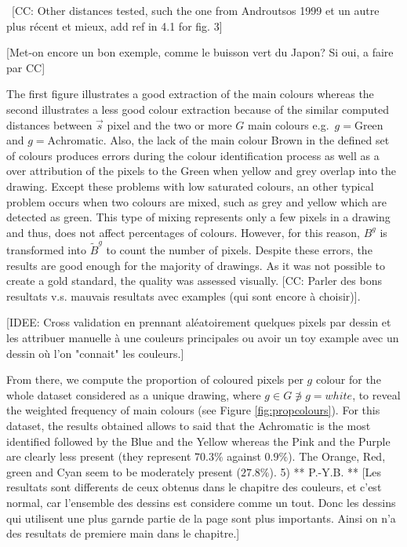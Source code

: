 \documentclass[11pt,a4paper]{article}
\begin{document}
\
{\color{red}[CC: Other distances tested, such the one from Androutsos 1999 et un autre plus récent et mieux, add ref in 4.1 for fig. 3]}

{\color{red}[Met-on encore un bon exemple, comme le buisson vert du Japon? Si oui, a faire par CC]}

The first figure illustrates a good extraction of the main colours whereas the second illustrates a less good colour extraction because of the similar computed distances between $\vec{s}$  pixel and the two or more $G$ main colours e.g.~$g = \mbox{Green}$ and $g = \mbox{Achromatic}$. 
Also, the lack of the main colour Brown in the defined set of colours produces errors during the colour identification process as well as a over attribution of the pixels to the Green when yellow and grey overlap into the drawing. Except these problems with low saturated colours, an other typical problem occurs when two colours are mixed, such as grey and yellow which are detected as green. This type of mixing represents only a few pixels in a drawing and thus, does not affect percentages of colours. However, for this reason, $B^g$ is transformed into $\tilde{B}^g$ to count the number of pixels. Despite these errors, the results are good enough for the majority of drawings. As it was not possible to create a gold standard, the quality was assessed visually.
{\color{red}[CC:  Parler des bons resultats v.s. mauvais resultats avec examples (qui sont encore \`a choisir)]}.

{\small \color{teal}[IDEE: Cross validation en prennant al\' eatoirement quelques pixels par dessin et les attribuer manuelle \`a une couleurs principales ou avoir un toy example avec un dessin o\`u l'on "connait" les couleurs.]}

From there, we compute the proportion of coloured pixels per $g$ colour for the whole dataset considered as a unique drawing, where $g \in G \not\ni g = white$, to reveal the weighted frequency of main colours (see Figure \ref{fig:propcolours}). 
For this dataset, the results obtained allows to said that the Achromatic is the most identified followed by the Blue and the Yellow whereas the Pink and the Purple are clearly less present (they represent $70.3\%$ against $0.9\%$). The Orange, Red, green and Cyan seem to be moderately present ($27.8\%$). 
{\color{red} 5) ** P.-Y.B. ** [Les resultats sont differents de ceux obtenus dans le chapitre des couleurs, et c'est normal, car l'ensemble des dessins est considere comme un tout. Donc les dessins qui utilisent une plus garnde partie de la page sont plus importants. Ainsi on n'a des resultats de premiere main dans le chapitre.]}
\end{document}
